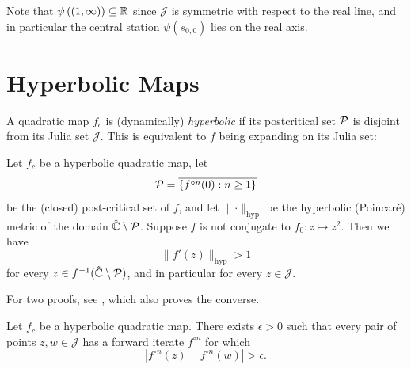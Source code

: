 Note that $\psi\left((1,\infty)\right)\subseteq\mathbb{R}$ since $\mathcal{J}$ is symmetric with respect to the real line, and in particular the central station $\psi(s_{0,0})$ lies on the real axis.


\section{Hyperbolic Maps}

A quadratic map $f_c$ is (dynamically) \emph{hyperbolic} if
 its postcritical set $\operatorname{\mathcal P}$ is disjoint from its Julia set $\mathcal J$.
 This is equivalent to $f$ being expanding on its Julia set:

 \begin{theorem}\label{theorem:hyperbolic_expanding}
Let $f_c$ be a hyperbolic quadratic map, 
let 
\begin{equation*}
	\operatorname{\mathcal P} = \overline{\{f^{\circ n} (0): n \geq 1\}}
\end{equation*}
 be the (closed) post-critical set of $f$,
and let $\lVert \cdot \rVert_\mathrm{hyp}$ be the 
hyperbolic (Poincaré) metric of the domain $\hat {\mathbb C} \setminus \operatorname{\mathcal P}$. Suppose $f$ is not conjugate to $f_0: z\mapsto z^2$.
Then we have 
\begin{equation}
	\lVert f'(z) \rVert_\mathrm{hyp} > 1
\end{equation}
for every $z\in f^{-1}(\hat {\mathbb C} \setminus \operatorname{\mathcal P})$, and in particular for every $z \in \mathcal J$.
 \end{theorem}
 For two proofs, see \cite[Theorem 19.1]{milnor_book}, which also proves the converse.



\begin{corollary} \label{elevator for points on julia}
	Let $f_c$ be a hyperbolic quadratic map.
	There exists  $\epsilon > 0$ such that 
	every pair of points $z,w\in\mathcal{J}$
	 has a forward iterate $f^{\circ n}$ for which 
	 \begin{equation*}
		\left|f^{\circ n}(z)-f^{\circ n}(w)\right|>\epsilon.	
	 \end{equation*}
	 
\end{corollary}

